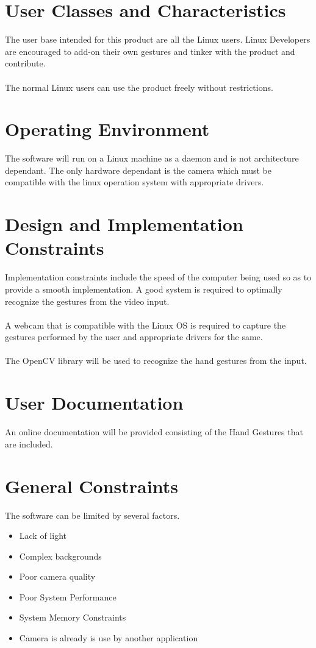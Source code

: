 \documentclass{scrreprt}
\begin{document}
\section{User Classes and Characteristics}
The user base intended for this product are all the Linux users. Linux Developers are encouraged to add-on their own gestures and tinker with the product and contribute.
\\
\\The normal Linux users can use the product freely without restrictions.

\section{Operating Environment}
The software will run on a Linux machine as a daemon and is not architecture dependant. The only hardware dependant is the camera which must be compatible with the linux operation system with appropriate drivers.

\section{Design and Implementation Constraints}
Implementation constraints include the speed of the computer being used so as to provide a smooth implementation. A good system is required to optimally recognize the gestures from the video input. 
\\
\\A webcam that is compatible with the Linux OS is required to capture the gestures performed by the user and appropriate drivers for the same.
\\
\\The OpenCV library will be used to recognize the hand gestures from the input.


\section{User Documentation}
An online documentation will be provided consisting of the Hand Gestures that are included.

\section{General Constraints}
The software can be limited by several factors.
\begin{itemize}
    \item Lack of light
    \item Complex backgrounds
    \item Poor camera quality
    \item Poor System Performance
    \item System Memory Constraints
    \item Camera is already is use by another application
\end{itemize}
\end{document}

